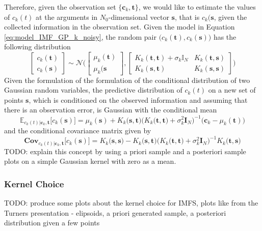 Therefore, given the observation set $\big\{ \mathbf{c}_k, \mathbf{t} \big\}$, we would like to estimate the values of $c_k(t)$ at the arguments in $N_0$-dimensional vector $\mathbf{s}$, that is $c_k(\mathbf{s}$, given the collected information in the observation set. Given the model in Equation \eqref{eq:model_IMF_GP_k_noisy}, the random pair $\big(c_k(\mathbf{t}), c_k(\mathbf{s})\big)$ has the following distribution
\begin{equation}
\begin{bmatrix}
c_k(\mathbf{t})\\
c_k(\mathbf{s})
\end{bmatrix} \sim \mathcal{N}\bigg( \begin{bmatrix}
\mu_k(\mathbf{t}) \\
\mu_k(\mathbf{s}
\end{bmatrix} , \begin{bmatrix}
K_k(\mathbf{t},\mathbf{t})+ \sigma_k \mathbb{I}_N & K_k(\mathbf{t},\mathbf{s}) \\
K_k(\mathbf{s},\mathbf{t}) & K_k(\mathbf{s},\mathbf{s})
\end{bmatrix}  \bigg)
\end{equation}
Given the formulation of the formulation of the conditional distribution of two Gaussian random variables,  the predictive distribution of $c_k(t)$ on a new set of points $\mathbf{s}$, which is conditioned on the observed information and assuming that there is an observation error, is Gaussian with the conditional mean
\begin{equation*}
\mathbb{E}_{c_k(t)|\mathbf{c}_k, \mathbf{t}} \big[c_k(\mathbf{s})] = \mu_k(\mathbf{s}) +  K_k \big(\mathbf{s},\mathbf{t}\big)\Big( K_k \big(\mathbf{t},\mathbf{t}\big) + \sigma^2_k \mathbf{I}_N \Big) ^{-1} \big( \mathbf{c}_k - \mu_k(\mathbf{t})\big) 
\end{equation*}
and the conditional covariance matrix given by
\begin{equation*}
\mathbf{Cov}_{c_k(t)|\mathbf{c}_k,\mathbf{t}} \big[c_k(\mathbf{s})] = K_k \big(\mathbf{s},\mathbf{s}\big) - K_k\big(\mathbf{s},\mathbf{t}\big) \Big( K_k \big(\mathbf{t},\mathbf{t}\big) + \sigma^2_k \mathbf{I}_N \Big)^{-1} K_k \big(\mathbf{t},\mathbf{s}\big) 
\end{equation*}
TODO: explain this concept by using a priori sample and a posteriori sample plots on a simple Gaussian kernel with zero as a mean. 



\subsubsection{Kernel Choice}
TODO: produce some plots about the kernel choice for IMFS, plots like from the Turners presentation - elipsoids, a priori generated sample, a posteriori distribution given a few points


